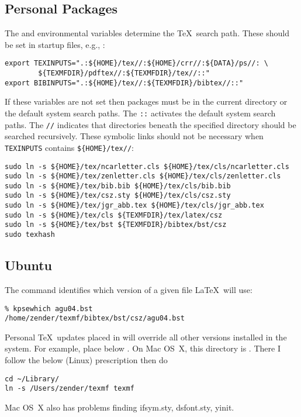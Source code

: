 \documentclass[12pt]{article}
\begin{document}
\subsection[Personal packages]{Personal Packages}\label{sxn:prs}
The  and  environmental variables
determine the \TeX\ search path.
These should be set in startup files, e.g., :
\begin{verbatim}
export TEXINPUTS=".:${HOME}/tex//:${HOME}/crr//:${DATA}/ps//: \
        ${TEXMFDIR}/pdftex//:${TEXMFDIR}/tex//::" 
export BIBINPUTS=".:${HOME}/tex//:${TEXMFDIR}/bibtex//::"
\end{verbatim}
If these variables are not set then packages must be in the current
directory or the default system search paths.
The \verb'::' activates the default system search paths.
The \verb'//' indicates that directories beneath the specified
directory should be searched recursively. 
These symbolic links should not be necessary when \verb'TEXINPUTS'
contains \verb'${HOME}/tex//':
\begin{verbatim}
sudo ln -s ${HOME}/tex/ncarletter.cls ${HOME}/tex/cls/ncarletter.cls
sudo ln -s ${HOME}/tex/zenletter.cls ${HOME}/tex/cls/zenletter.cls
sudo ln -s ${HOME}/tex/bib.bib ${HOME}/tex/cls/bib.bib
sudo ln -s ${HOME}/tex/csz.sty ${HOME}/tex/cls/csz.sty
sudo ln -s ${HOME}/tex/jgr_abb.tex ${HOME}/tex/cls/jgr_abb.tex
sudo ln -s ${HOME}/tex/cls ${TEXMFDIR}/tex/latex/csz
sudo ln -s ${HOME}/tex/bst ${TEXMFDIR}/bibtex/bst/csz
sudo texhash
\end{verbatim}

\subsection[Ubuntu]{Ubuntu}\label{sxn:bnt}
The command  identifies which version of a
given file \LaTeX\ will use: 
\begin{verbatim}
% kpsewhich agu04.bst
/home/zender/texmf/bibtex/bst/csz/agu04.bst
\end{verbatim}
Personal \TeX\ updates placed in  will override all
other versions installed in the system.
For example, place  below .
On Mac OS~X, this directory is \flidx{~/Library/texmf}.
There I follow the below (Linux) prescription then do
\begin{verbatim}
cd ~/Library/
ln -s /Users/zender/texmf texmf
\end{verbatim}
Mac OS~X also has problems finding ifsym.sty, dsfont.sty, yinit.
\end{document}
